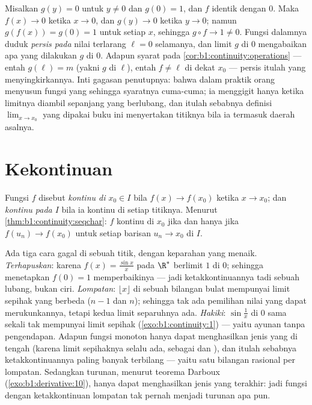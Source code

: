 \begin{example}\label{ex:b1:continuity:compositiontrap}
Misalkan $g(y) = 0$ untuk $y \neq 0$ dan $g(0) = 1$, dan $f$
identik dengan $0$. Maka $f(x) \to 0$ ketika $x \to 0$, dan $g(y) \to 0$
ketika $y \to 0$; namun $g(f(x)) = g(0) = 1$ untuk setiap $x$, sehingga $g
\circ f \to 1 \neq 0$. Fungsi dalamnya duduk \emph{persis pada}
nilai terlarang $\ell = 0$ selamanya, dan limit $g$ di $0$
mengabaikan apa yang dilakukan $g$ di $0$. Adapun syarat pada
\cref{cor:b1:continuity:operations} --- entah $g(\ell) = m$
(yakni $g$  di $\ell$), entah $f \neq \ell$ di dekat $x_0$ ---
persis itulah yang menyingkirkannya. Inti gagasan penutupnya: bahwa dalam
praktik orang menyusun fungsi yang \emph{} sehingga
syaratnya cuma-cuma; ia menggigit hanya ketika limitnya diambil sepanjang
 yang berlubang, dan itulah sebabnya definisi
$\lim_{x \to x_0}$ yang dipakai buku ini menyertakan titiknya bila ia
termasuk daerah asalnya.
\end{example}

\section{Kekontinuan}

\begin{definition}\label{def:b1:continuity:continuous}
Fungsi $f$ disebut \emph{kontinu di $x_0 \in I$} bila $f(x)
\to f(x_0)$ ketika $x \to x_0$; dan \emph{kontinu pada $I$} bila ia
kontinu di setiap titiknya. Menurut
\cref{thm:b1:continuity:seqchar}: $f$ kontinu di $x_0$ jika dan hanya jika
$f(u_n) \to f(x_0)$ untuk setiap barisan $u_n \to x_0$ di $I$.
\end{definition}

\begin{example}\label{ex:b1:continuity:taxonomy}
Ada tiga cara gagal di sebuah titik, dengan keparahan yang menaik.
\emph{Terhapuskan}: karena $f(x) = \frac{\sin x}{x}$ pada $\R^*$ berlimit
$1$ di $0$; sehingga menetapkan $f(0) = 1$ memperbaikinya --- jadi ketakkontinuannya
tadi sebuah lubang, bukan ciri. \emph{Lompatan}: $\lfloor x \rfloor$ di
sebuah bilangan bulat mempunyai limit sepihak yang berbeda ($n - 1$ dan $n$); sehingga tak ada
pemilihan nilai yang dapat merukunkannya, tetapi kedua limit separuhnya ada.
\emph{Hakiki}: $\sin\frac1x$ di $0$ sama sekali tak mempunyai limit sepihak
(\cref{exo:b1:continuity:1}) --- yaitu ayunan tanpa
pengendapan. Adapun fungsi monoton hanya dapat menghasilkan jenis yang di tengah
(karena limit sepihaknya selalu ada, sebagai  dan ),
dan itulah sebabnya  ketakkontinuannya paling banyak terbilang ---
yaitu satu bilangan rasional per lompatan. Sedangkan turunan, menurut teorema Darboux
(\cref{exo:b1:derivative:10}), hanya dapat menghasilkan jenis yang terakhir:
jadi fungsi dengan ketakkontinuan lompatan tak pernah menjadi turunan
apa pun.
\end{example}

